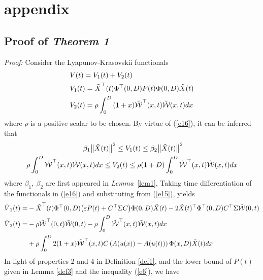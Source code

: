 \documentclass[12pt,draftcls,onecolumn]{IEEEtran}
\begin{document}
\section{appendix}

\subsection{Proof of {\it Theorem 1}}

{\it Proof:}
Consider the Lyapunov-Krasovskii functionals
\begin{equation} \label{e16}
\begin{aligned}
&V(t) = {V_1}(t) + {V_2}(t) \\
&{V_1}(t) = {{\tilde X}^{\top} }(t){\Phi ^{\top} }(0,D)P(t)\Phi (0,D)\tilde X(t)  \\
&{V_2}(t) = \rho \int_0^D {(1 + x){{\tilde {\cal W}}^{\top} }(x,t)\tilde {\cal W}(x,t)dx} 	
\end{aligned}
\end{equation}
where $\rho $ is a positive scalar to be chosen. By virtue of (\ref{e16}), it can be inferred that
\begin{equation} \label{e17}
\begin{aligned}
& ~~~~~~~~~~~~~~~~~~~~~~~~{\beta _1}{\left\| {\tilde X(t)} \right\|^2} \le {V_1}(t) \le {\beta _2}{\left\| {\tilde X(t)} \right\|^2}  \\
&\rho \int_0^D {{{\tilde {\cal W}}^{\top} }(x,t)\tilde {\cal W}(x,t)dx}  \le {V_2}(t) \le \rho (1 + D)\int_0^D {{{\tilde {\cal W}}^{\top} }(x,t)\tilde {\cal W}(x,t)dx}
\end{aligned}
\end{equation}
where $\beta_1,~\beta_2$ are first appeared in \textit{Lemma}~\ref{lem1}, Taking time differentiation of the functionals in (\ref{e16}) and substituting from (\ref{e15}), yields
\begin{align*}
{{\dot V}_1}(t) = &  - {{\tilde X}^{\top} }(t){\Phi ^{\top} }(0,D)\big( {\varepsilon P(t) + {C^{\top} }{\rm{\Sigma }}C} \big)\Phi (0,D)\tilde X(t) - 2\tilde X{(t)^{\top} }{\Phi ^{\top} }(0,D){C^{\top} }{\rm{\Sigma }}\tilde {\cal W}(0,t)\\
{{\dot V}_2}(t) = &  - \rho {{\tilde {\cal W}}^{\top} }(0,t)\tilde {\cal W}(0,t) - \rho \int_0^D {{{\tilde {\cal W}}^{\top} }(x,t)\tilde {\cal W}(x,t)dx} \\
& + \rho \int_0^D {2(1 + x){{\tilde {\cal W}}^{\top} }(x,t)C\left( {A(u(x)) - A(u(t))} \right)\Phi (x,D)\tilde X(t)dx}
\end{align*}
 In light of properties 2 and 4 in  Definition \ref{def1}, and the lower bound of $ P(t) $ given in Lemma \ref{def3} and the inequality (\ref{e6}), we have
\end{document}
